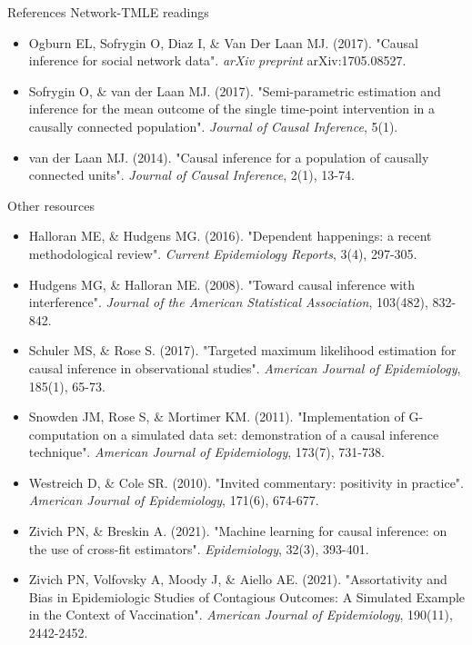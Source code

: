 \documentclass{beamer}
\begin{document}
\begin{frame}{References}
	\tiny
	Network-TMLE readings
	\begin{itemize}
		\item Ogburn EL, Sofrygin O, Diaz I, \& Van Der Laan MJ. (2017). "Causal inference for social network data". \textit{arXiv preprint} arXiv:1705.08527.
		\item Sofrygin O, \& van der Laan MJ. (2017). "Semi-parametric estimation and inference for the mean outcome of the single time-point intervention in a causally connected population". \textit{Journal of Causal Inference}, 5(1).
		\item van der Laan MJ. (2014). "Causal inference for a population of causally connected units". \textit{Journal of Causal Inference}, 2(1), 13-74.
	\end{itemize}
	Other resources
	\begin{itemize}
		\item Halloran ME, \& Hudgens MG. (2016). "Dependent happenings: a recent methodological review". \textit{Current Epidemiology Reports}, 3(4), 297-305.
		\item Hudgens MG, \& Halloran ME. (2008). "Toward causal inference with interference". \textit{Journal of the American Statistical Association}, 103(482), 832-842.
		\item Schuler MS, \& Rose S. (2017). "Targeted maximum likelihood estimation for causal inference in observational studies". \textit{American Journal of Epidemiology}, 185(1), 65-73.
		\item Snowden JM, Rose S, \& Mortimer KM. (2011). "Implementation of G-computation on a simulated data set: demonstration of a causal inference technique". \textit{American Journal of Epidemiology}, 173(7), 731-738.
		\item Westreich D, \& Cole SR. (2010). "Invited commentary: positivity in practice". \textit{American Journal of Epidemiology}, 171(6), 674-677.
		\item Zivich PN, \& Breskin A. (2021). "Machine learning for causal inference: on the use of cross-fit estimators". \textit{Epidemiology}, 32(3), 393-401.
		\item Zivich PN, Volfovsky A, Moody J, \& Aiello AE. (2021). "Assortativity and Bias in Epidemiologic Studies of Contagious Outcomes: A Simulated Example in the Context of Vaccination". \textit{American Journal of Epidemiology}, 190(11), 2442-2452.
	\end{itemize}
\end{frame}
\end{document}
